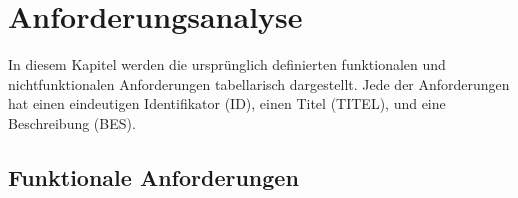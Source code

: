 \newcommand{\reqtable}[3]{
    \begin{center}
    \begin{tabular}{ | l | p{13cm} |}
    \hline
    \textbf{ID:} & \textbf{#1} \\ \hline
    TITEL: & #2 \\ \hline
    BES: & #3 \\
    \hline
    \end{tabular}
    \end{center}
}

\chapter{Anforderungsanalyse}	
\label{cha:anforderungsanalyse}
In diesem Kapitel werden die ursprünglich definierten funktionalen und nichtfunktionalen Anforderungen tabellarisch dargestellt. Jede der Anforderungen hat einen eindeutigen Identifikator (ID), einen Titel (TITEL), und eine Beschreibung (BES).

\section{Funktionale Anforderungen}
\label{sec:anforderungsanalyse:funktional}

